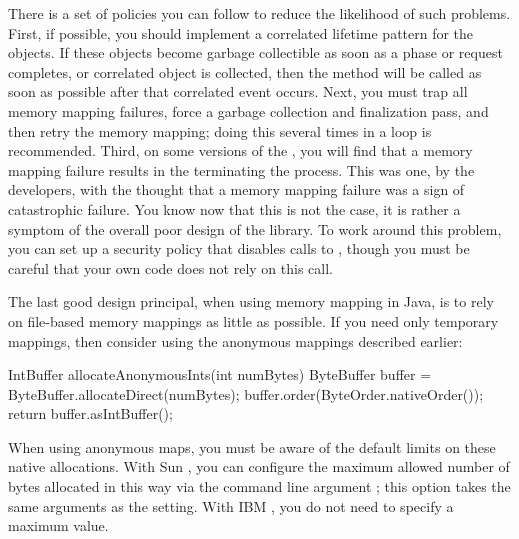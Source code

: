 There is a set of policies you can follow to reduce the likelihood of such
problems. First, if possible, you should implement a correlated lifetime pattern
for the  objects. If these objects become garbage collectible
as soon as a phase or request completes, or correlated object is collected, then
the  method will be called as soon as possible after
that correlated event occurs. Next, you must trap all memory mapping failures,
force a garbage collection and finalization pass, and then retry the memory
mapping; doing this several times in a loop is recommended. Third, on some
versions of the \jre, you will find that a memory mapping failure results in the
\jre terminating the process. This was one, by the \jre developers, with the
thought that a memory mapping failure was a sign of catastrophic failure. You
know now that this is not the case, it is rather a symptom of the overall poor
design of the  library. To work around this problem, you can set
up a security policy that disables calls to , though you must
be careful that your own code does not rely on this call.

The last good design principal, when using memory mapping in Java, is to rely on
file-based memory mappings as little as possible. If you need only temporary
mappings, then consider using the anonymous mappings described earlier:
\begin{shortlisting}
IntBuffer allocateAnonymousInts(int numBytes) {
   ByteBuffer buffer = ByteBuffer.allocateDirect(numBytes);
   buffer.order(ByteOrder.nativeOrder());
   return buffer.asIntBuffer();
}
\end{shortlisting}
When using anonymous maps, you must be aware of the default limits on these
native allocations. With Sun \jres, you can configure the maximum allowed number
of bytes allocated in this way via the command line argument
; this option takes the same arguments as the
 setting. With IBM \jres, you do not need to specify a maximum value.


